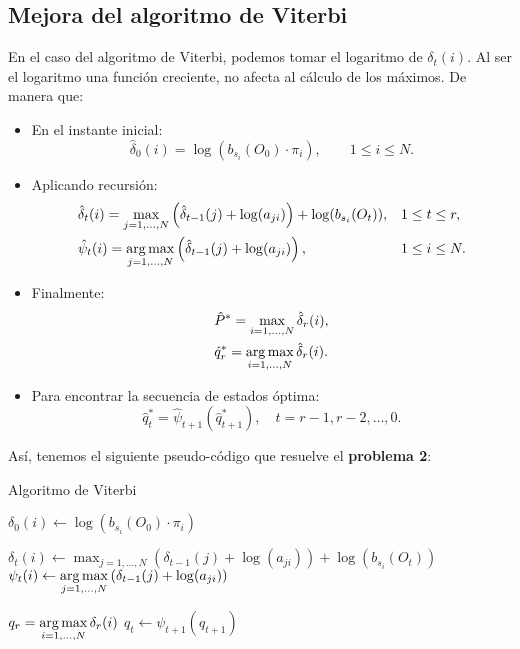 \subsection{Mejora del algoritmo de Viterbi}
En el caso del algoritmo de Viterbi, podemos tomar el logaritmo de $\delta_t(i)$. Al ser el logaritmo una función creciente, no afecta al cálculo de los máximos. De manera que:
\begin{itemize}
    \item En el instante inicial:
    \begin{equation*}
        \hat{\delta}_0(i)=\log(b_{s_i}(O_0)\cdot\pi_i), \qquad 1\leq i\leq N.
    \end{equation*}
    \item Aplicando recursión:
    \begin{align*}
        &\hat{\delta}_t(i)=\max_{j=1,\dots,N}\left( \hat{\delta}_{t-1}(j)+\log(a_{ji}) \right)+\log(b_{s_i}(O_t)), && 1\leq t\leq r, \\
        &\hat{\psi}_t(i)=\operatorname*{\arg\max}_{j=1,\dots,N}\left(\hat{\delta}_{t-1}(j)+\log(a_{ji})\right),  &&  1\leq i\leq N.
    \end{align*}
    \item Finalmente:
    \begin{align*}
        & \hat{P}^*=\max_{i=1,\dots,N} \hat{\delta}_r(i),\\
        & \hat{q}_r^*=\operatorname*{\arg\max}_{i=1,\dots,N} \hat{\delta}_r(i).
    \end{align*} 
    \item Para encontrar la secuencia de estados óptima:
    \[\hat{q}_t^*=\hat{\psi}_{t+1}(\hat{q}_{t+1}^*), \quad t=r-1,r-2,\dots,0.\]
\end{itemize}
Así, tenemos el siguiente pseudo-código que resuelve el \textbf{problema 2}: \medskip
\begin{breakablealgorithm}
\caption{Algoritmo de Viterbi} \label{PseudocódigoViterbi}
\begin{algorithmic}[1]


        \State $\delta_0(i)\gets \log(b_{s_i}(O_0)\cdot\pi_i)$
    \EndFor \State
    
            \State $\delta_t(i)\gets \displaystyle\max_{j=1,\dots,N}\left( \delta_{t-1}(j)+\log(a_{ji}) \right)+\log(b_{s_i}(O_t))$
            \State $\psi_t(i) \gets \displaystyle\operatorname*{\arg\max}_{j=1,\dots,N}\left(\delta_{t-1}(j)+\log(a_{ji})\right)$
         \EndFor
    \EndFor
    
    \State $q_r=\displaystyle\operatorname*{\arg\max}_{i=1,\dots,N} \delta_r(i)$
        \State $q_t\gets\psi_{t+1}(q_{t+1})$
    \EndFor
    
\end{algorithmic}
\end{breakablealgorithm}